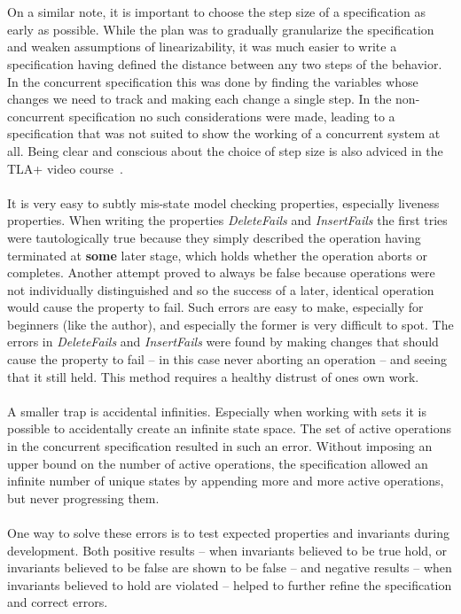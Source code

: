 \documentclass{uit-thesis}
\begin{document}
\\\\
On a similar note, it is important to choose the step size of a specification as early as possible. While the plan was to gradually granularize the specification and weaken assumptions of linearizability, it was much easier to write a specification having defined the distance between any two steps of the behavior. In the concurrent specification this was done by finding the variables whose changes we need to track and making each change a single step. In the non-concurrent specification no such considerations were made, leading to a specification that was not suited to show the working of a concurrent system at all. Being clear and conscious about the choice of step size is also adviced in the TLA+ video course~\cite{Lamport_video_2019}.
\\\\
It is very easy to subtly mis-state model checking properties, especially liveness properties. When writing the properties \textit{DeleteFails} and \textit{InsertFails} the first tries were tautologically true because they simply described the operation having terminated at \textbf{some} later stage, which holds whether the operation aborts or completes. Another attempt proved to always be false because operations were not individually distinguished and so the success of a later, identical operation would cause the property to fail. Such errors are easy to make, especially for beginners (like the author), and especially the former is very difficult to spot. The errors in \textit{DeleteFails} and \textit{InsertFails} were found by making changes that should cause the property to fail -- in this case never aborting an operation -- and seeing that it still held. This method requires a healthy distrust of ones own work.
\\\\
A smaller trap is accidental infinities. Especially when working with sets it is possible to accidentally create an infinite state space. The set of active operations in the concurrent specification resulted in such an error. Without imposing an upper bound on the number of active operations, the specification allowed an infinite number of unique states by appending more and more active operations, but never progressing them.
\\\\
One way to solve these errors is to test expected properties and invariants during development. Both positive results -- when invariants believed to be true hold, or invariants believed to be false are shown to be false -- and negative results -- when invariants believed to hold are violated -- helped to further refine the specification and correct errors.
\end{document}

